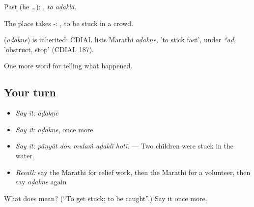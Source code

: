 Past (he …):  , \emph{to aḍaklā}.

The place takes -:  , to be stuck in a crowd.

\begin{cousinweb}
\textbf{} (\emph{aḍakṇe}) is inherited: CDIAL lists Marathi \emph{aḍakṇe}, 'to stick fast', under \emph{*aḍ}, 'obstruct, stop' (CDIAL 187).
\end{cousinweb}

\begin{grammarlens}[title={What you've built}]
One more word for telling what happened.
\end{grammarlens}

\subsection*{Your turn}
\begin{itemize}
\raggedright
  \item \emph{Say it:} \emph{aḍakṇe}
  \item \emph{Say it:} \emph{aḍakṇe}, once more
  \item \emph{Say it:} \emph{pāṇyāt don mulaṁ aḍaklī hotī.} — Two children were stuck in the water.
  \item \emph{Recall:} say the Marathi for relief work, then the Marathi for a volunteer, then say \emph{aḍakṇe} again
\end{itemize}

\begin{tcolorbox}[breakable,colback=teal!4,colframe=teal!35!black,title={Before you move on}]
What does  mean? (\textquotedblleft{}To get stuck; to be caught\textquotedblright{}.) Say it once more.
\end{tcolorbox}
